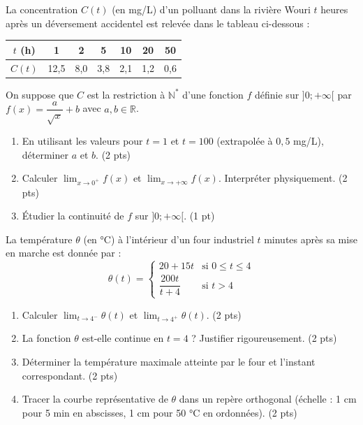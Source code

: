 \documentclass[11pt]{article}
\begin{document}
\begin{exercice}
La concentration $C(t)$ (en mg/L) d'un polluant dans la rivière Wouri $t$ heures après un déversement accidentel est relevée dans le tableau ci-dessous :
\begin{center}
\begin{tabular}{|c|c|c|c|c|c|c|}
\hline
$t$ (h) & 1 & 2 & 5 & 10 & 20 & 50 \\
\hline
$C(t)$ & 12,5 & 8,0 & 3,8 & 2,1 & 1,2 & 0,6 \\
\hline
\end{tabular}
\end{center}
On suppose que $C$ est la restriction à $\mathbb{N}^*$ d'une fonction $f$ définie sur $]0; +\infty[$ par $f(x) = \dfrac{a}{\sqrt{x}} + b$ avec $a, b \in \mathbb{R}$.
\begin{enumerate}
    \item En utilisant les valeurs pour $t=1$ et $t=100$ (extrapolée à $0,5$ mg/L), déterminer $a$ et $b$. (2 pts)
    \item Calculer $\lim_{x \to 0^+} f(x)$ et $\lim_{x \to +\infty} f(x)$. Interpréter physiquement. (2 pts)
    \item Étudier la continuité de $f$ sur $]0; +\infty[$. (1 pt)
\end{enumerate}
\end{exercice}

\begin{exercice}
La température $\theta$ (en °C) à l'intérieur d'un four industriel $t$ minutes après sa mise en marche est donnée par :
\[
\theta(t) = \begin{cases}
20 + 15t & \text{si } 0 \le t \le 4 \\
\dfrac{200t}{t+4} & \text{si } t > 4
\end{cases}
\]
\begin{enumerate}
    \item Calculer $\lim_{t \to 4^-} \theta(t)$ et $\lim_{t \to 4^+} \theta(t)$. (2 pts)
    \item La fonction $\theta$ est-elle continue en $t=4$ ? Justifier rigoureusement. (2 pts)
    \item Déterminer la température maximale atteinte par le four et l'instant correspondant. (2 pts)
    \item Tracer la courbe représentative de $\theta$ dans un repère orthogonal (échelle : 1 cm pour 5 min en abscisses, 1 cm pour 50 °C en ordonnées). (2 pts)
\end{enumerate}
\end{exercice}
\end{document}
